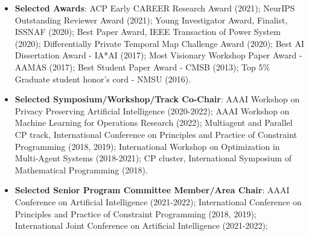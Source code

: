 \documentclass[times, 10pt]{article}
\begin{document}
\begin{itemize}[leftmargin=*, parsep=2pt, itemsep=2pt, topsep=2pt]
\item \textbf{Selected Awards}: ACP Early CAREER Research Award (2021); NeurIPS Outstanding Reviewer Award (2021); Young Investigator Award, Finalist, ISSNAF (2020); Best Paper Award, IEEE Transaction of Power System (2020); Differentially Private Temporal Map Challenge Award (2020); Best AI Dissertation Award - IA*AI (2017); Most Visionary Workshop Paper Award - AAMAS (2017); Best Student Paper Award - CMSB (2013); Top 5\% Graduate student honor’s cord - NMSU (2016).

\item \textbf{Selected Symposium/Workshop/Track Co-Chair}: AAAI Workshop on Privacy Preserving Artificial Intelligence (2020-2022); AAAI Workshop on Machine Learning for Operations Research (2022); Multiagent and Parallel CP track, International Conference on Principles and Practice of Constraint Programming (2018, 2019); International Workshop on Optimization in Multi-Agent Systems (2018-2021); CP cluster, International Symposium of Mathematical Programming (2018).

\item \textbf{Selected Senior Program Committee Member/Area Chair}: AAAI Conference on Artificial Intelligence (2021-2022); International Conference on Principles and Practice of Constraint Programming (2018, 2019); International Joint Conference on Artificial Intelligence (2021-2022);
\end{itemize}
\end{document}

